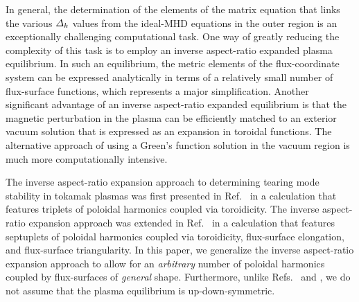 \documentclass[12pt,prb,aps]{revtex4-1}
\begin{document}
In general, the  determination of the elements of the matrix equation that links the various ${\mit\Delta}_k$ values from the ideal-MHD equations 
in the outer region is an exceptionally challenging computational task.\cite{connor,nish,gal,pletz,pletz1,
tokuda,brennan,ham,ham1,ham2,am1,am2,am3,aglas,aglas1,aglas2}
One way of greatly reducing the complexity of this task is to employ an inverse aspect-ratio expanded plasma equilibrium.\cite{greene,gim} In such an equilibrium,
the metric elements of the flux-coordinate system can be expressed analytically in terms of a relatively small number of  flux-surface functions,
which represents a major simplification.\cite{con0} Another significant advantage of an inverse aspect-ratio expanded equilibrium is that the magnetic perturbation in the plasma can be efficiently 
matched to an exterior vacuum solution  that is expressed as an expansion in toroidal functions.\cite{am1} The alternative approach of using a Green's
function solution in the vacuum region is much more computationally intensive.\cite{chance,xu}  

 The inverse aspect-ratio expansion approach to determining tearing mode stability in tokamak plasmas 
was first presented in Ref.~ in a calculation that  features triplets of  poloidal harmonics coupled via toroidicity. 
The
inverse aspect-ratio expansion approach was extended in Ref.~ in a calculation that features septuplets of poloidal harmonics coupled via toroidicity, flux-surface elongation, and
flux-surface triangularity. In this paper, we  generalize the inverse aspect-ratio expansion  approach to allow for an {\em arbitrary}\/ number of poloidal harmonics coupled
by flux-surfaces of {\em general}\/ shape. Furthermore, unlike Refs.~ and , we do not assume that the plasma
equilibrium 
is up-down-symmetric. 
\end{document}
